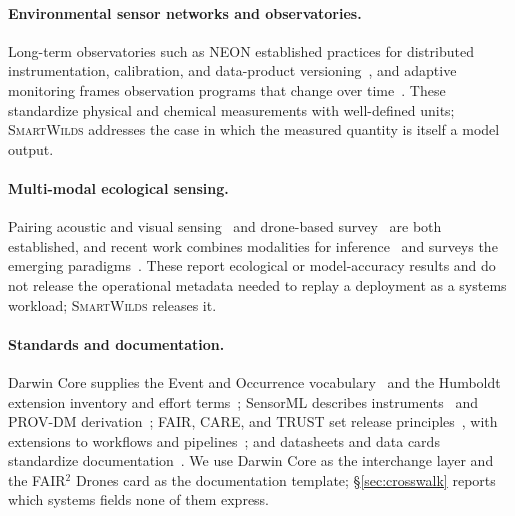 \documentclass[sigconf]{acmart}
\newcommand{\smartwilds}{\textsc{SmartWilds}\xspace}
\begin{document}
\paragraph{Environmental sensor networks and observatories.}
Long-term observatories such as NEON established practices for
distributed instrumentation, calibration, and data-product
versioning~\cite{metzger2019neon,staccone2021neon}, and adaptive
monitoring frames observation programs that change over
time~\cite{lindenmayer2009adaptive,henrys2024adaptive,jain2004adaptive}.
These standardize physical and chemical measurements with well-defined
units; \smartwilds addresses the case in which the measured quantity
is itself a model output.

\paragraph{Multi-modal ecological sensing.}
Pairing acoustic and visual
sensing~\cite{buxton2018pairing,Waegele2022Multisensor} and drone-based
survey~\cite{koger2023drones,Koger2026Efficient,Schad2023Drones,Corcoran2021Automated}
are both established, and recent work combines modalities for
inference~\cite{Haucke2025DeepMultimodal,Miao2026Multimodal,Chen2026Snapshots}
and surveys the emerging
paradigms~\cite{lombardo2026paradigms,tuia2022perspectives,Tuia2026Digital,Pollock2025Harnessing,pollock2026roam,pierrat2025proximal}.
These report ecological or model-accuracy results and do not release
the operational metadata needed to replay a deployment as a systems
workload; \smartwilds releases it.

\paragraph{Standards and documentation.}
Darwin Core supplies the Event and Occurrence
vocabulary~\cite{wieczorek2012darwincore,tdwgDarwinCore} and the
Humboldt extension inventory and effort terms~\cite{tdwgHumboldt};
SensorML describes instruments~\cite{ogcSensorML} and PROV-DM
derivation~\cite{w3cProvDM}; FAIR, CARE, and TRUST set release
principles~\cite{wilkinson2016fair,carroll2020care,lin2020trust}, with
extensions to workflows and
pipelines~\cite{wilkinson2025fairworkflows,mitchell2022fairpipeline,pennington2025pipeline,woodcharlson2026faircope};
and datasheets and data cards standardize
documentation~\cite{gebru2021datasheets,pushkarna2022datacards}. We use
Darwin Core as the interchange layer and the FAIR$^2$ Drones card as the
documentation template; \S\ref{sec:crosswalk} reports which systems
fields none of them express.
\end{document}

